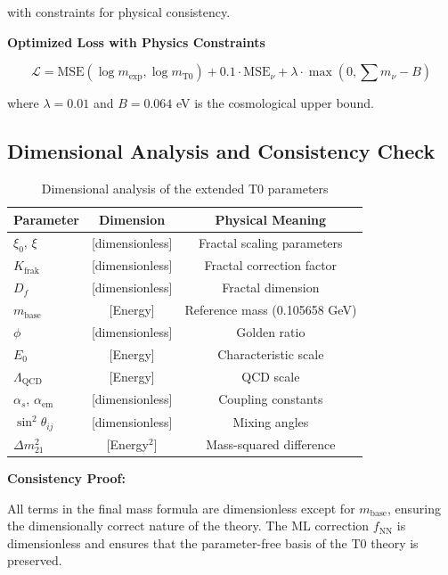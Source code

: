 	with constraints for physical consistency.
	
	\textbf{Optimized Loss with Physics Constraints}
	
	\begin{equation}
		\mathcal{L} = \text{MSE}(\log m_{\exp}, \log m_{\text{T0}}) + 0.1 \cdot \text{MSE}_{\nu} + \lambda \cdot \max(0, \sum m_{\nu} - B)
	\end{equation}
	
	where $\lambda = 0.01$ and $B = 0.064$ eV is the cosmological upper bound.
	
	\subsection{Dimensional Analysis and Consistency Check}
	
	\begin{table}[h]
		\centering
		\begin{tabular}{lcc}
			\toprule
			\textbf{Parameter} & \textbf{Dimension} & \textbf{Physical Meaning} \\
			\midrule
			$\xi_0$, $\xi$ & [dimensionless] & Fractal scaling parameters \\
			$K_{\text{frak}}$ & [dimensionless] & Fractal correction factor \\
			$D_f$ & [dimensionless] & Fractal dimension \\
			$m_{\text{base}}$ & [Energy] & Reference mass (0.105658 GeV) \\
			$\phi$ & [dimensionless] & Golden ratio \\
			$E_0$ & [Energy] & Characteristic scale \\
			$\Lambda_{\text{QCD}}$ & [Energy] & QCD scale \\
			$\alpha_s$, $\alpha_{\text{em}}$ & [dimensionless] & Coupling constants \\
			$\sin^2 \theta_{ij}$ & [dimensionless] & Mixing angles \\
			$\Delta m^2_{21}$ & [Energy$^2$] & Mass-squared difference \\
			\bottomrule
		\end{tabular}
		\caption{Dimensional analysis of the extended T0 parameters}
		\label{tab:dimensions}
	\end{table}
	
	\textbf{Consistency Proof:}
	
	All terms in the final mass formula are dimensionless except for $m_{\text{base}}$, ensuring the dimensionally correct nature of the theory. The ML correction $f_{\text{NN}}$ is dimensionless and ensures that the parameter-free basis of the T0 theory is preserved.
	
